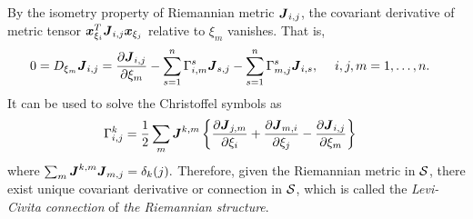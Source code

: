 \documentclass[11pt]{article}
\begin{document}
\begin{itemize}
By the isometry property of Riemannian metric $\boldsymbol{J}_{i,j}$, the covariant derivative of metric tensor $\boldsymbol{x}_{\xi_{i}}^{T}\boldsymbol{J}_{i,j}\boldsymbol{x}_{\xi_{j}}$ relative to $\xi_{m}$  vanishes. That is,
\begin{align}
0=D_{\xi_{m}}\boldsymbol{J}_{i,j} &=\frac{\partial \boldsymbol{J}_{i,j}}{ \partial \xi_{m}} - \sum_{s=1}^{n}\Gamma_{i,m}^{s}\boldsymbol{J}_{s,j}- \sum_{s=1}^{n}\Gamma_{m,j}^{s}\boldsymbol{J}_{i,s},\;\quad i,j,m=1,\ldots,n. \label{eqn: Christoffel_metric_eqn}
\end{align}
It can be used to solve the Christoffel symbols as 
\begin{align}
\Gamma_{i,j}^{k} &= \frac{1}{2}\sum_{m}\boldsymbol{J}^{k,m}\left\{\frac{\partial \boldsymbol{J}_{j,m}}{ \partial \xi_{i}}+ \frac{\partial \boldsymbol{J}_{m,i}}{ \partial \xi_{j}}  - \frac{\partial \boldsymbol{J}_{i,j}}{ \partial \xi_{m}}\right\} \label{eqn: Christoffel_metric_expr}
\end{align}
where $\sum_{m}\boldsymbol{J}^{k,m}\boldsymbol{J}_{m,j}=\delta_{k}(j).$
Therefore, given the Riemannian metric in ${\mathcal S}$, there exist unique covariant derivative or connection in ${\mathcal S}$, which is called the \emph{Levi-Civita connection} of \emph{the Riemannian structure}.  
\end{itemize}

\newpage
\end{document}
